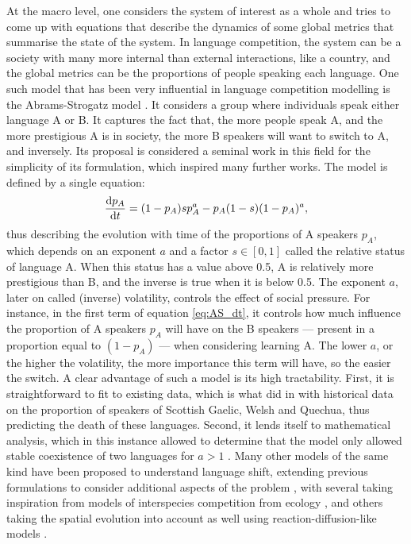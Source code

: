 \documentclass[../thesis.tex]{subfiles}
\begin{document}
At the macro level, one considers the system of interest as a whole and tries to come up
with equations that describe the dynamics of some global metrics that summarise the
state of the system. In language competition, the system can be a society with many more
internal than external interactions, like a country, and the global metrics can be the
proportions of people speaking each language. One such model that has been very
influential in language competition modelling is the Abrams-Strogatz model
\cite{AbramsModellingDynamics2003}. It considers a group where individuals speak either
language A or B. It captures the fact that, the more people speak A, and the more
prestigious A is in society, the more B speakers will want to switch to A, and
inversely. Its proposal is considered a seminal work in this field for the simplicity of
its formulation, which inspired many further works. The model is defined by a single
equation:
\begin{equation}
  \label{eq:AS_dt}
  \dv{p_A}{t} = (1 - p_A) s p_A^a - p_A (1 - s) (1 - p_A)^a,
\end{equation}
thus describing the evolution with time of the proportions of A speakers $p_A$, which
depends on an exponent $a$ and a factor $s \in [0, 1]$ called the relative status of
language A. When this status has a value above 0.5, A is relatively more prestigious
than B, and the inverse is true when it is below 0.5. The exponent $a$, later on called
(inverse) volatility, controls the effect of social pressure. For instance, in the first
term of equation \eqref{eq:AS_dt}, it controls how much influence the proportion of A
speakers $p_A$ will have on the B speakers --- present in a proportion equal to $(1 -
p_A)$ --- when considering learning A. The lower $a$, or the higher the volatility, the
more importance this term will have, so the easier the switch. A clear advantage of such
a model is its high tractability. First, it is straightforward to fit to existing data,
which is what \citeauthor{AbramsModellingDynamics2003} did in
\cite{AbramsModellingDynamics2003} with historical data on the proportion of speakers of
Scottish Gaelic, Welsh and Quechua, thus predicting the death of these languages.
Second, it lends itself to mathematical analysis, which in this instance allowed
\citeauthor{VazquezAgentBased2010} to determine that the model only allowed stable
coexistence of two languages for $a > 1$ \cite{VazquezAgentBased2010}. Many other models
of the same kind have been proposed to understand language shift, extending previous
formulations to consider additional aspects of the problem
\cite{MiraInterlinguisticSimilarity2005,PinascoCoexistenceLanguages2006,HeinsaluRoleBilinguals2014,MinettModellingEndangered2008},
with several taking inspiration from models of interspecies competition from ecology
\cite{KandlerEcologicalModels2008,SoleDiversityCompetition2010}, and others taking the
spatial evolution into account as well using reaction-diffusion-like models
\cite{KandlerDemographyLanguage2009,PatriarcaInfluenceGeography2009,IsernLanguageExtinction2014,ProchazkaQuantifyingDriving2017}.
\end{document}
